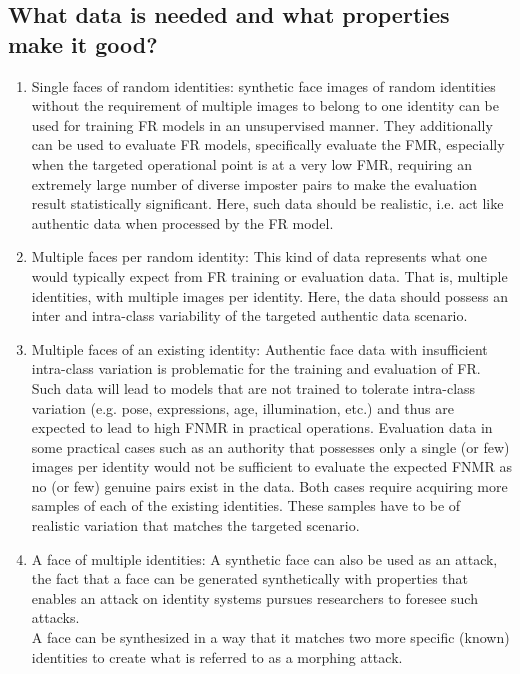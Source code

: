 \documentclass[12pt]{article}
\begin{document}
\subsection{What data is needed and
what properties make it
good?}
\begin{enumerate}
  \item Single faces of random identities: synthetic face images of random identities without the requirement of multiple images
  to belong to one identity can be used for training FR models in an unsupervised manner. They
  additionally can be used to evaluate FR models,
  specifically evaluate the FMR, especially when
  the targeted operational point is at a very low
  FMR, requiring an extremely large number of
  diverse imposter pairs to make the evaluation
  result statistically significant. Here, such data
  should be realistic, i.e. act like authentic data
  when processed by the FR model.
  \item Multiple faces per random identity: This
  kind of data represents what one would typically expect from FR training or evaluation data.
  That is, multiple identities, with multiple images per identity. Here, the data should possess an inter and intra-class variability of the targeted authentic data scenario.
  \item Multiple faces of an existing identity: Authentic face data with insufficient intra-class
  variation is problematic for the training and evaluation of FR. Such data will lead to models that are not trained
  to tolerate intra-class variation (e.g. pose, expressions, age, illumination, etc.) and thus are
  expected to lead to high FNMR in practical operations. Evaluation data
  in some practical cases such as an authority that
  possesses only a single (or few) images per identity would not be
  sufficient to evaluate the expected FNMR as no
  (or few) genuine pairs exist in the data. Both
  cases require acquiring more samples of each of
  the existing identities. These samples have to
  be of realistic variation that matches the targeted scenario.
  \item A face of multiple identities: A synthetic
  face can also be used as an attack, the fact that
  a face can be generated synthetically with properties that enables an attack on identity systems
  pursues researchers to foresee such attacks.\\
  A face can be synthesized in a way that it matches
  two more specific (known) identities to create
  what is referred to as a morphing attack.\\

\end{enumerate}
\end{document}

